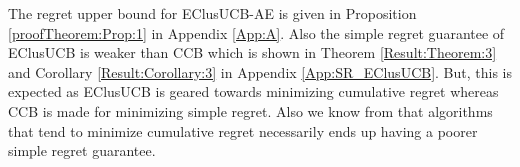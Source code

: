 The regret upper bound for EClusUCB-AE is given in Proposition \ref{proofTheorem:Prop:1} in Appendix \ref{App:A}. Also the simple regret guarantee of EClusUCB is weaker than CCB\cite{liu2016modification} which is shown in Theorem \ref{Result:Theorem:3} and Corollary \ref{Result:Corollary:3} in Appendix \ref{App:SR_EClusUCB}. But, this is expected as EClusUCB is geared towards minimizing cumulative regret whereas CCB is made for minimizing simple regret. Also we know from \citet{bubeck2009pure} that algorithms that tend to minimize cumulative regret necessarily ends up having a poorer simple regret guarantee.  




